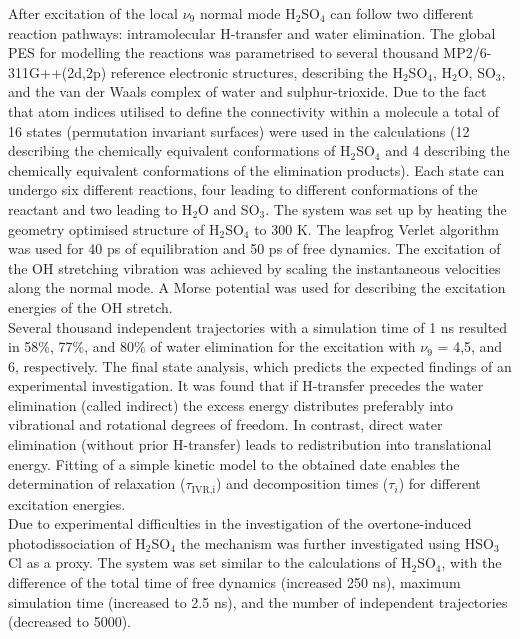 \documentclass[journal=jacsat,manuscript=article]{achemso}
\begin{document}
\noindent
After excitation of the local $\nu_9$ normal mode H$_2$SO$_4$ can
follow two different reaction pathways: intramolecular H-transfer and
water elimination. The global PES for modelling the reactions was
parametrised to several thousand MP2/6-311G++(2d,2p) reference
electronic structures, describing the H$_2$SO$_4$, H$_2$O, SO$_3$, and
the van der Waals complex of water and sulphur-trioxide. Due to the
fact that atom indices utilised to define the connectivity within a
molecule a total of 16 states (permutation invariant surfaces) were
used in the calculations (12 describing the chemically equivalent
conformations of H$_2$SO$_4$ and 4 describing the chemically
equivalent conformations of the elimination products). Each state can
undergo six different reactions, four leading to different
conformations of the reactant and two leading to H$_2$O and
SO$_3$. The system was set up by heating the geometry optimised
structure of H$_2$SO$_4$ to 300 K. The leapfrog Verlet algorithm was
used for 40 ps of equilibration and 50 ps of free dynamics. The
excitation of the OH stretching vibration was achieved by scaling the
instantaneous velocities along the normal mode. A Morse potential was
used for describing the excitation energies of the OH stretch.\\

\noindent
Several thousand independent trajectories with a simulation time of 1
ns resulted in 58\%, 77\%, and 80\% of water elimination for the
excitation with $\nu_9$ = 4,5, and 6, respectively. The final state
analysis, which predicts the expected findings of an experimental
investigation. It was found that if H-transfer precedes the water
elimination (called indirect) the excess energy distributes preferably
into vibrational and rotational degrees of freedom. In contrast,
direct water elimination (without prior H-transfer) leads to
redistribution into translational energy. Fitting of a simple kinetic
model to the obtained date enables the determination of relaxation
($\tau_{\text{IVR,i}}$) and decomposition times ($\tau_i$) for
different excitation energies.\\

\noindent
Due to experimental difficulties in the investigation of the
overtone-induced photodissociation of H$_2$SO$_4$ the mechanism was
further investigated using HSO$_3$Cl as a
proxy\cite{reyesbrickel.pccp.2016.msarmd}. The system was set similar
to the calculations of H$_2$SO$_4$, with the difference of the total
time of free dynamics (increased 250 ns), maximum simulation time
(increased to 2.5 ns), and the number of independent trajectories
(decreased to 5000).\\
\end{document}
